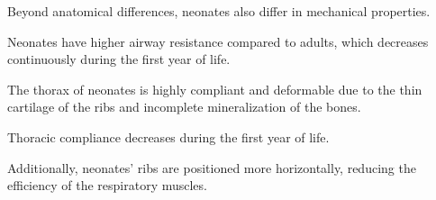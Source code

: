 Beyond anatomical differences, neonates also differ in mechanical
properties.

Neonates have higher airway resistance compared to adults, which
decreases continuously during the first year of life.

The thorax of neonates is highly compliant and deformable due to the
thin cartilage of the ribs and incomplete mineralization of the bones.

Thoracic compliance decreases during the first year of life.

Additionally, neonates' ribs are positioned more horizontally,
reducing the efficiency of the respiratory muscles.

